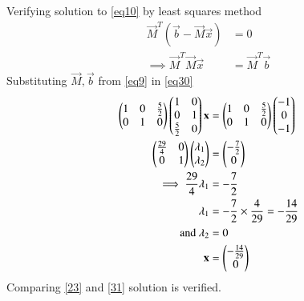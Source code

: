 \documentclass[journal,12pt,twocolumn]{IEEEtran}
\begin{document}
Verifying solution to \eqref{eq10} by least squares method
\begin{align}
	\vec{M}^T(\vec{b} - \vec{M}\vec{x}) &= 0\\
	\label{eq30}\implies \vec{M}^T\vec{M}\vec{x} &= \vec{M}^T\vec{b}
\end{align}
Substituting $\vec{M}, \vec{b}$ from \eqref{eq9} in \eqref{eq30}
\begin{align}
	\begin{pmatrix}1 & 0 & \frac{5}{2}\\0 & 1 & 0\end{pmatrix}\begin{pmatrix}1 & 0\\0 & 1\\\frac{5}{2} & 0\end{pmatrix}\mathbf{x} &= \begin{pmatrix}1 & 0 & \frac{5}{2}\\0 & 1 & 0\end{pmatrix}\begin{pmatrix}-1\\0\\-1\end{pmatrix}\\
	\begin{pmatrix}\frac{29}{4} & 0\\0 & 1\end{pmatrix}\begin{pmatrix}\lambda_1\\\lambda_2\end{pmatrix} &= \begin{pmatrix}-\frac{7}{2}\\0\end{pmatrix}\\
	\implies\frac{29}{4}\lambda_1 &= -\frac{7}{2}\\
	\lambda_1 &= -\frac{7}{2} \times \frac{4}{29} = -\frac{14}{29}\\
	\text{and }\lambda_2 &= 0\\
	\label{31}\mathbf{x} &= \begin{pmatrix}-\frac{14}{29}\\0\end{pmatrix}
\end{align}
Comparing \eqref{23} and \eqref{31} solution is verified.
\end{document}
